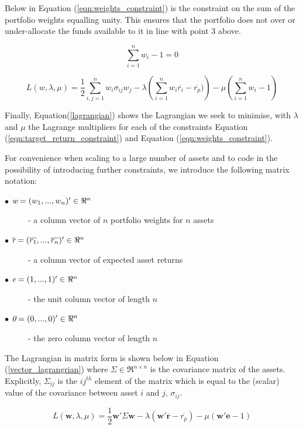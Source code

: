 \documentclass{article}
\begin{document}
Below in Equation (\ref{eqn:weights_constraint}) is the constraint on the sum of the portfolio weights equalling unity. This ensures that the portfolio does not over or under-allocate the funds available to it in line with point 3 above.

\begin{equation} 
\sum_{i=1}^{n} w_{i} - 1 = 0
\label{eqn:weights_constraint}
\end{equation}

\begin{equation} 
L(w, \lambda, \mu) =  \dfrac{1}{2} \sum_{i,j=1}^{n} w_{i} \sigma_{ij} w_{j} 
	-\lambda \left( \sum_{i=1}^{n} w_{i} \overline{r_i} - \overline{r_p}) \right)
	- \mu \left( \sum_{i=1}^{n} w_{i} - 1 \right)
\label{lagrangian}
\end{equation}

Finally, Equation(\ref{lagrangian}) shows the Lagrangian we seek to minimise, with $\lambda$ and $\mu$ the Lagrange multipliers for each of the constraints Equation (\ref{eqn:target_return_constraint}) and Equation (\ref{eqn:weights_constraint}).

For convenience when scaling to a large number of assets and to code in the possibility of introducing further constraints, we introduce the following matrix notation:

\begin{description}
\item [$\bullet$ $\emph{w} = (w_1,..., w_n)' \in \Re^n$ ] - a column vector of $n$ portfolio weights for $n$ assets
\item [$\bullet$ $\overline{\emph{r}} = (\overline{r_1},..., \overline{r_n})' \in \Re^n$ ] - a column vector of expected asset returns
\item [$\bullet$ $\emph{e} = (1,..., 1)' \in \Re^n$ ] - the unit column vector of length $n$
\item [$\bullet$ $\emph{0} = (0,..., 0)' \in \Re^n$ ] - the zero column vector of length $n$
\end{description}

The Lagrangian in matrix form is shown below in Equation (\ref{vector_lagrangrian}) where $\Sigma \in \Re^{n \times n}$ is the covariance matrix of the assets. Explicitly, $\Sigma_{ij}$ is the ${ij}^{th}$ element of the matrix which is equal to the (scalar) value of the covariance between asset $i$ and $j$,  $\sigma_{ij}$.

\begin{equation} 
L(\textbf{w}, \lambda, \mu)  = \dfrac{1}{2} \textbf{w}'\Sigma\textbf{w}
-\lambda \left( \textbf{w}'\overline{\textbf{r}} - \overline{r_p}\right)
-\mu \left( \textbf{w}'\textbf{e} - 1\right)
\label{vector_lagrangrian}
\end{equation}
\end{document}
